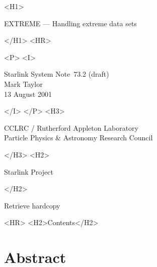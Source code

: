 \documentclass[twoside,11pt]{article}
\newcommand{\stardoccategory}  {Starlink System Note}
\newcommand{\stardocsource}    {ssn\stardocnumber}
\newcommand{\stardocnumber}    {73.2 (draft)}
\newcommand{\stardocauthors}   {Mark Taylor}
\newcommand{\stardocdate}      {13 August 2001}
\newcommand{\stardoctitle}     {EXTREME --- Handling extreme data sets}
\newcommand{\htmladdnormallink}[2]{#1}
\newcommand{\htmladdimg}[1]{}
\newcommand{\htmlref}[2]{#1}
\newcommand{\htmladdtonavigation}[1]{}
\newcommand{\xlabel}[1]{}
\renewcommand{\_}{\texttt{\symbol{95}}}
\begin{document}
\begin{htmlonly}
   \xlabel{}
   \begin{rawhtml} <H1> \end{rawhtml}
      \stardoctitle
   \begin{rawhtml} </H1> <HR> \end{rawhtml}

   \begin{rawhtml} <P> <I> \end{rawhtml}
   \stardoccategory\ \stardocnumber \\
   \stardocauthors \\
   \stardocdate
   \begin{rawhtml} </I> </P> <H3> \end{rawhtml}
      \htmladdnormallink{CCLRC / Rutherford Appleton Laboratory}
                        {http://www.cclrc.ac.uk} \\
      \htmladdnormallink{Particle Physics \& Astronomy Research Council}
                        {http://www.pparc.ac.uk} \\
   \begin{rawhtml} </H3> <H2> \end{rawhtml}
      \htmladdnormallink{Starlink Project}{http://www.starlink.ac.uk/}
   \begin{rawhtml} </H2> \end{rawhtml}
   \htmladdnormallink{\htmladdimg{source.gif} Retrieve hardcopy}
      {http://www.starlink.ac.uk/cgi-bin/hcserver?\stardocsource}\\

  \label{stardoccontents}
  \begin{rawhtml}
    <HR>
    <H2>Contents</H2>
  \end{rawhtml}
  \htmladdtonavigation{\htmlref{\htmladdimg{contents_motif.gif}}
        {stardoccontents}}

  \section{\xlabel{abstract}Abstract}

\end{htmlonly}
\end{document}
